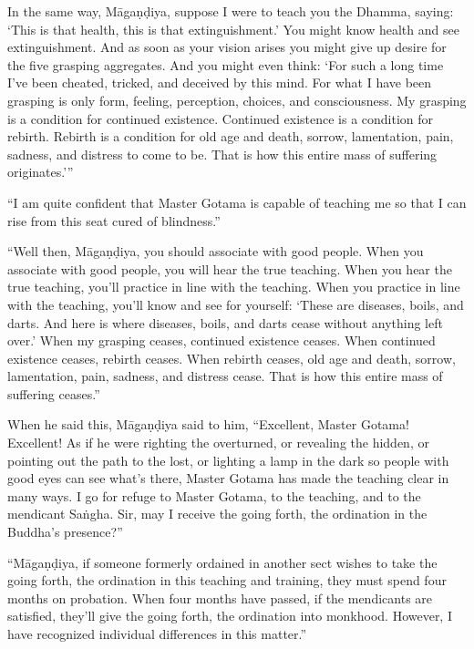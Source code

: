 \documentclass[12pt,openany]{book}%
\begin{document}
In the same way, \textsanskrit{Māgaṇḍiya}, suppose I were to teach you the Dhamma, saying: ‘This is that health, this is that extinguishment.’ You might know health and see extinguishment. And as soon as your vision arises you might give up desire for the five grasping aggregates. And you might even think: ‘For such a long time I’ve been cheated, tricked, and deceived by this mind. For what I have been grasping is only form, feeling, perception, choices, and consciousness. My grasping is a condition for continued existence. Continued existence is a condition for rebirth. Rebirth is a condition for old age and death, sorrow, lamentation, pain, sadness, and distress to come to be. That is how this entire mass of suffering originates.’” 

“I am quite confident that Master Gotama is capable of teaching me so that I can rise from this seat cured of blindness.” 

“Well then, \textsanskrit{Māgaṇḍiya}, you should associate with good people. When you associate with good people, you will hear the true teaching. When you hear the true teaching, you’ll practice in line with the teaching. When you practice in line with the teaching, you’ll know and see for yourself: ‘These are diseases, boils, and darts. And here is where diseases, boils, and darts cease without anything left over.’ When my grasping ceases, continued existence ceases. When continued existence ceases, rebirth ceases. When rebirth ceases, old age and death, sorrow, lamentation, pain, sadness, and distress cease. That is how this entire mass of suffering ceases.” 

When he said this, \textsanskrit{Māgaṇḍiya} said to him, “Excellent, Master Gotama! Excellent! As if he were righting the overturned, or revealing the hidden, or pointing out the path to the lost, or lighting a lamp in the dark so people with good eyes can see what’s there, Master Gotama has made the teaching clear in many ways. I go for refuge to Master Gotama, to the teaching, and to the mendicant \textsanskrit{Saṅgha}. Sir, may I receive the going forth, the ordination in the Buddha’s presence?” 

“\textsanskrit{Māgaṇḍiya}, if someone formerly ordained in another sect wishes to take the going forth, the ordination in this teaching and training, they must spend four months on probation. When four months have passed, if the mendicants are satisfied, they’ll give the going forth, the ordination into monkhood. However, I have recognized individual differences in this matter.” 
\end{document}
